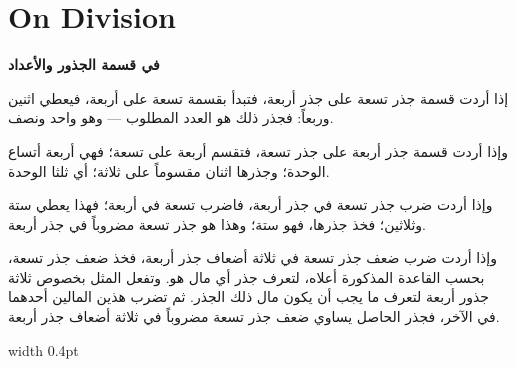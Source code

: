 \documentclass[11pt,a4paper]{book}
\begin{document}
\chapter{On Division}
\label{ch:division}

\noindent\begin{minipage}[t]{0.48\textwidth}
\raggedleft

\begin{Arabic}
\textbf{في قسمة الجذور والأعداد}

إذا أردت قسمة جذر تسعة على جذر أربعة، فتبدأ بقسمة تسعة على أربعة، فيعطي اثنين وربعاً: فجذر ذلك هو العدد المطلوب — وهو واحد ونصف.

وإذا أردت قسمة جذر أربعة على جذر تسعة، فتقسم أربعة على تسعة؛ فهي أربعة أتساع الوحدة؛ وجذرها اثنان مقسوماً على ثلاثة؛ أي ثلثا الوحدة.

وإذا أردت ضرب جذر تسعة في جذر أربعة، فاضرب تسعة في أربعة؛ فهذا يعطي ستة وثلاثين؛ فخذ جذرها، فهو ستة؛ وهذا هو جذر تسعة مضروباً في جذر أربعة.

وإذا أردت ضرب ضعف جذر تسعة في ثلاثة أضعاف جذر أربعة، فخذ ضعف جذر تسعة، بحسب القاعدة المذكورة أعلاه، لتعرف جذر أي مال هو. وتفعل المثل بخصوص ثلاثة جذور أربعة لتعرف ما يجب أن يكون مال ذلك الجذر. ثم تضرب هذين المالين أحدهما في الآخر، فجذر الحاصل يساوي ضعف جذر تسعة مضروباً في ثلاثة أضعاف جذر أربعة.
\end{Arabic}

\end{minipage}%
\hfill\vrule width 0.4pt\hfill
\end{document}
